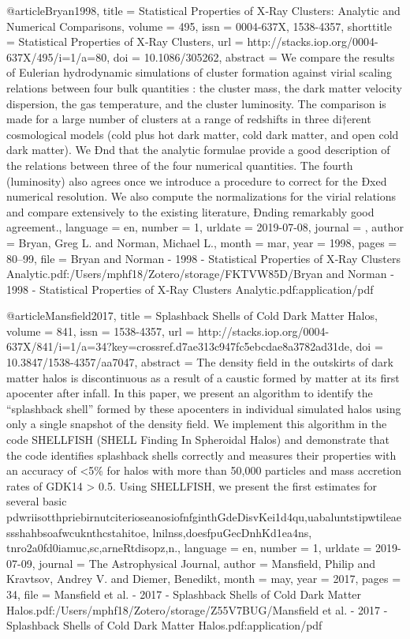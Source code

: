 {@article{Bryan1998,
	title = {Statistical {Properties} of {X}‐{Ray} {Clusters}: {Analytic} and {Numerical} {Comparisons}},
	volume = {495},
	issn = {0004-637X, 1538-4357},
	shorttitle = {Statistical {Properties} of {X}‐{Ray} {Clusters}},
	url = {http://stacks.iop.org/0004-637X/495/i=1/a=80},
	doi = {10.1086/305262},
	abstract = {We compare the results of Eulerian hydrodynamic simulations of cluster formation against virial scaling relations between four bulk quantities : the cluster mass, the dark matter velocity dispersion, the gas temperature, and the cluster luminosity. The comparison is made for a large number of clusters at a range of redshifts in three di†erent cosmological models (cold plus hot dark matter, cold dark matter, and open cold dark matter). We Ðnd that the analytic formulae provide a good description of the relations between three of the four numerical quantities. The fourth (luminosity) also agrees once we introduce a procedure to correct for the Ðxed numerical resolution. We also compute the normalizations for the virial relations and compare extensively to the existing literature, Ðnding remarkably good agreement.},
	language = {en},
	number = {1},
	urldate = {2019-07-08},
	journal = {\apj},
	author = {Bryan, Greg L. and Norman, Michael L.},
	month = mar,
	year = {1998},
	pages = {80--99},
	file = {Bryan and Norman - 1998 - Statistical Properties of X‐Ray Clusters Analytic.pdf:/Users/mphf18/Zotero/storage/FKTVW85D/Bryan and Norman - 1998 - Statistical Properties of X‐Ray Clusters Analytic.pdf:application/pdf}
}


@article{Mansfield2017,
	title = {Splashback {Shells} of {Cold} {Dark} {Matter} {Halos}},
	volume = {841},
	issn = {1538-4357},
	url = {http://stacks.iop.org/0004-637X/841/i=1/a=34?key=crossref.d7ae313c947fc5ebcdae8a3782ad31de},
	doi = {10.3847/1538-4357/aa7047},
	abstract = {The density ﬁeld in the outskirts of dark matter halos is discontinuous as a result of a caustic formed by matter at its ﬁrst apocenter after infall. In this paper, we present an algorithm to identify the “splashback shell” formed by these apocenters in individual simulated halos using only a single snapshot of the density ﬁeld. We implement this algorithm in the code SHELLFISH (SHELL Finding In Spheroidal Halos) and demonstrate that the code identiﬁes splashback shells correctly and measures their properties with an accuracy of {\textless}5\% for halos with more than 50,000 particles and mass accretion rates of GDK14 {\textgreater} 0.5. Using SHELLFISH, we present the ﬁrst estimates for several basic pdwriisotthpriebirnutciterioseanosiofnfginthGdeDisvKei1d4qu,uabaluntstipwtileaessshahbsoafwcuknthcstahitoe, lnilnss,doesfpuGecDnhKd1ea4ns, tnro2a0fd0iamuc,sc,arneRtdisopz,n.},
	language = {en},
	number = {1},
	urldate = {2019-07-09},
	journal = {The Astrophysical Journal},
	author = {Mansfield, Philip and Kravtsov, Andrey V. and Diemer, Benedikt},
	month = may,
	year = {2017},
	pages = {34},
	file = {Mansfield et al. - 2017 - Splashback Shells of Cold Dark Matter Halos.pdf:/Users/mphf18/Zotero/storage/Z55V7BUG/Mansfield et al. - 2017 - Splashback Shells of Cold Dark Matter Halos.pdf:application/pdf}
}


}
